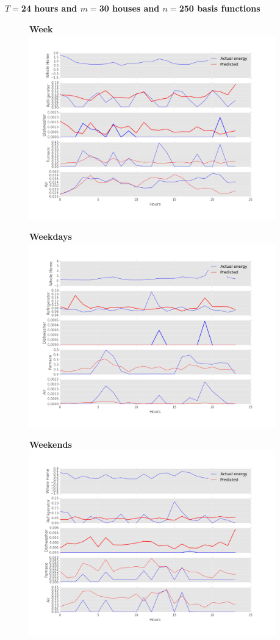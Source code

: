 \pagebreak[4]
\centerline{\textbf{$T=$24 hours and $m=$30 houses and $n=$250 basis functions}}
\begin{figure}[H]
		\centering
		\textbf{Week}\vspace{0.00001in}
		\includegraphics[width=\textwidth,height=8cm]{./figures/normal_250_24}
\end{figure}
\begin{figure}[H]
		\centering
		\textbf{Weekdays}\vspace{0.00001in}
		\includegraphics[width=\textwidth,height=8cm]{./figures/days_250_24}
	\end{figure}
\begin{figure}[H]
		\centering
		\textbf{Weekends}\vspace{0.00001in}
		\includegraphics[width=\textwidth,height=8cm]{./figures/end_250_24}
\end{figure}
	
